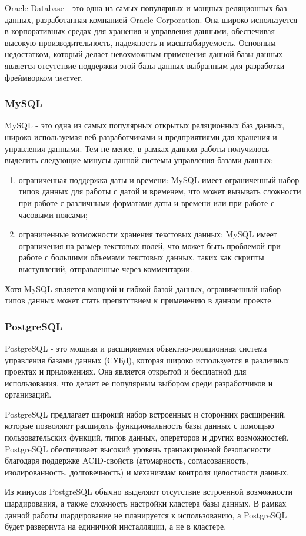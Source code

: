 Oracle Database - это одна из самых популярных и мощных реляционных баз данных, разработанная компанией Oracle Corporation. Она широко используется в корпоративных средах для хранения и управления данными, обеспечивая высокую производительность, надежность и масштабируемость. Основным недостатком, который делает невохможным применения данной базы данных является отсутствие поддержки этой базы данных выбранным для разработки фреймворком userver.


\subsubsection{MySQL}

MySQL - это одна из самых популярных открытых реляционных баз данных, широко используемая веб-разработчиками и предприятиями для хранения и управления данными. Тем не менее, в рамках данном работы получилось выделить следующие минусы данной системы управления базами данных: 

\begin{enumerate}
	\item ограниченная поддержка даты и времени: MySQL имеет ограниченный набор типов данных для работы с датой и временем, что может вызывать сложности при работе с различными форматами даты и времени или при работе с часовыми поясами;
	\item ограниченные возможности хранения текстовых данных: MySQL имеет ограничения на размер текстовых полей, что может быть проблемой при работе с большими объемами текстовых данных, таких как скрипты выступлений, отправленные через комментарии.
\end{enumerate}

Хотя MySQL является мощной и гибкой базой данных, ограниченный набор типов данных может стать препятствием к применению в данном проекте.


\subsubsection{PostgreSQL}

PostgreSQL - это мощная и расширяемая объектно-реляционная система управления базами данных (СУБД), которая широко используется в различных проектах и приложениях. Она является открытой и бесплатной для использования, что делает ее популярным выбором среди разработчиков и организаций. 

PostgreSQL предлагает широкий набор встроенных и сторонних расширений, которые позволяют расширять функциональность базы данных с помощью пользовательских функций, типов данных, операторов и других возможностей. PostgreSQL обеспечивает высокий уровень транзакционной безопасности благодаря поддержке ACID-свойств (атомарность, согласованность, изолированность, долговечность) и механизмам контроля целостности данных.

Из минусов PostgreSQL обычно выделяют отсутствие встроенной возможности шардирования, а также сложность настройки кластера базы данных. В рамках данной работы шардирование не планируется к использованию, а PostgreSQL будет развернута на единичной инсталляции, а не в кластере.

\pagebreak
